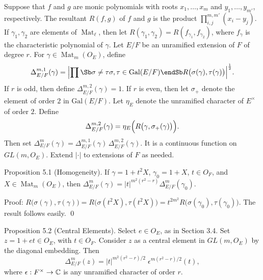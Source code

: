 Suppose that $f$ and $g$ are monic polynomials with roots
  $ x_1, \dots , x_m $ 
and
  $ y_1, \dots , y_{m'} $,
respectively.
The resultant
  $ R(f,g) $
of $f$ and $g$ is the product
  $ \prod_{i,j}^{m,m'} (x_i-y_j) $.
If
  $ \gamma_1, \gamma_2 $
are elements of 
  $ \operatorname{Mat}_{\ell} $, then
let
  $ R (\gamma_1, \gamma_2) =
    R (f_{\gamma_1}, f_{\gamma_2} ) $,
where 
  $ f_{\gamma} $
is the characteristic polynomial of 
  $ \gamma $.
Let 
  $ E / F $ 
be an unramified extension of $F$ of degree $r$.
For
  $ \gamma \in \operatorname{Mat}_m (O_E) $,
define
%
$$  
  \Delta_{E/F}^{m,1} (\gamma) =
    \Bigl|
      \prod\Sb 
         \sigma \neq \tau \\
         \sigma, \tau \in \text{Gal} (E/F)
       \endSb
       R 
       \bigl(
          \sigma (\gamma), \tau (\gamma)
       \bigr)
    \Bigr|^{\frac12} .
$$
%
If $r$ is odd, then define
  $ \Delta_{E/F}^{m,2} (\gamma) = 1 $.
If $r$ is even,  then let
  $ \sigma_+ $
denote the element of order $2$ in 
  $ \text{Gal} (E/F) $.
Let
  $ \eta_E $
denote the unramified character of
  $ E^{\times} $ 
of order $2$.
Define
  $$ \Delta_{E/F}^{m,2}
    (\gamma) =
    \eta_E
    \Bigl(
      R 
      \bigl(
        \gamma,\sigma_+ (\gamma) 
      \bigr)
     \Bigr) .$$
Then set
  $ \Delta_{E/F}^m (\gamma) = 
    \Delta_{E/F}^{m, 1} (\gamma) \,
    \Delta_{E/F}^{m,2} (\gamma) $.
It is a continuous function on
  $ GL(m, O_E) $.
Extend
  $ | \cdot | $
to extensions of $F$ as needed.

\bigskip
\proclaim Proposition {5.1} (Homogeneity).
If
  $ \gamma = 1 + t^2 X $,
  $ \gamma_0 = 1 + X $,
  $ t \in O_F $, and 
  $ X \in \operatorname{Mat}_m (O_E) $,
then
  $ \Delta_{E/F}^m (\gamma) =
     |t|^{m^2 (r^2-r) } 
    \Delta_{E/F}^m (\gamma_0) $.
\finishproclaim

\pproclaim Proof:
$  R 
  \bigl(
    \sigma (\gamma),\tau (\gamma) 
  \bigr)
=
  R 
  \bigl( 
    \sigma (t^2 X), \tau (t^2 X)
  \bigr) 
=
  t^{2m^2} R
  \bigl(
    \sigma (\gamma_0), \tau (\gamma_0)
  \bigr)
$.
%
The result follows easily.
\qed
\finishpproclaim

\bigskip
\proclaim Proposition {5.2} (Central Elements).
Select 
  $ e \in O_E $, as in Section 3.4.
Set
  $ z = 1 + e t\in O_E$, with $t\in O_F$.
Consider $z$ as a central element in 
  $ GL(m, O_E) $
by the diagonal embedding.
Then 
%
$$
  \Delta_{E/F}^m (z) =
  |t|^{ m^2 (r^2-r)/2 } \;
  \epsilon^{ m (r^2-r)/2 }(t),
$$
%
where
  $ \epsilon: F^{\times} \to {\Bbb C} $
is any unramified character 
of order $r$.
\finishproclaim

